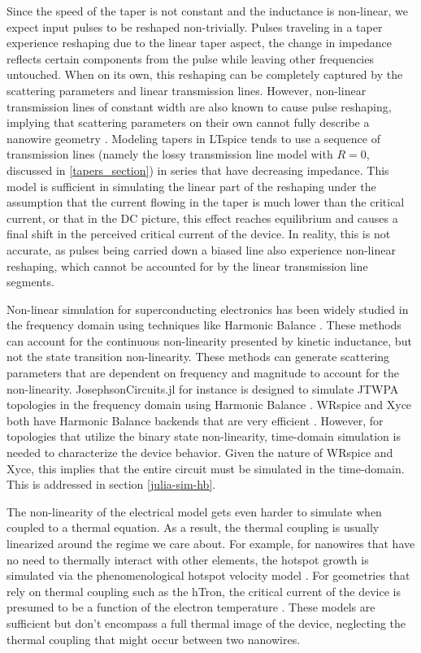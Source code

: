 \documentclass[]{article}
\newcommand{\todoidkcite}[2][]{}
\newcommand{\todoidea}[2][]{}
\begin{document}
Since the speed of the taper is not constant and the inductance is non-linear,
we expect input pulses to be reshaped non-trivially\todoidkcite{reshaping?}. Pulses traveling
in a taper experience reshaping due to the linear taper aspect, the change in impedance
reflects certain components from the pulse while leaving other frequencies untouched.
When on its own, this reshaping can be completely captured by the scattering parameters and linear 
transmission lines. 
However,
non-linear transmission lines of constant width are also known to cause pulse reshaping, 
implying that scattering parameters on their own cannot fully describe a nanowire geometry
\cite{nl_tline_reshape}. 
Modeling tapers in LTspice tends to use a
sequence of transmission lines (namely the lossy transmission line model with $R=0$, 
discussed in \ref{tapers_section}) in series that have decreasing impedance. 
This model
is sufficient in simulating the linear part of the reshaping under the assumption
that the current flowing in the taper is much lower than the critical current, or
that in the DC picture, this effect reaches equilibrium and causes a final shift in the
perceived critical current of the device. In reality, this is not accurate, as pulses
being carried down a biased line also experience non-linear reshaping, which cannot
be accounted for by the linear transmission line segments.

Non-linear simulation for superconducting electronics has been widely studied in the 
frequency domain
using techniques like Harmonic Balance \cite{hb-book}. 
These methods can account for the continuous 
non-linearity presented by kinetic inductance, but not the state transition non-linearity.
These methods can generate scattering parameters that are dependent on frequency and
magnitude to account for the non-linearity.
JosephsonCircuits.jl for instance is designed
to simulate JTWPA topologies in the frequency domain using Harmonic Balance \cite{josephsoncircsjl}. WRspice
and Xyce both have Harmonic Balance backends that are very efficient \cite{wrspice, xyce_reference}. However,
for topologies that utilize the binary state non-linearity, time-domain simulation 
is needed to characterize the device behavior. Given the nature of WRspice and Xyce,
this implies that the entire circuit must be simulated in the time-domain. This is
addressed in section \ref{julia-sim-hb}.

The non-linearity of the electrical model gets even harder to simulate when coupled to
a thermal equation. As a result, the thermal coupling is usually linearized around the 
regime we care about. For example, for nanowires that have no need to thermally
interact with other elements, the hotspot growth is simulated via the phenomenological
hotspot velocity model \cite{phen_model, matteo_thesis}. 
For geometries that rely on thermal coupling such as the hTron, the critical current
of the device is presumed to be a function of the electron temperature \cite{matteo_thesis}.
These models are sufficient but don't encompass a full thermal image of the device,
neglecting the thermal coupling that might occur between two nanowires.
\todoidea[]{think about this more idk...}
\end{document}
